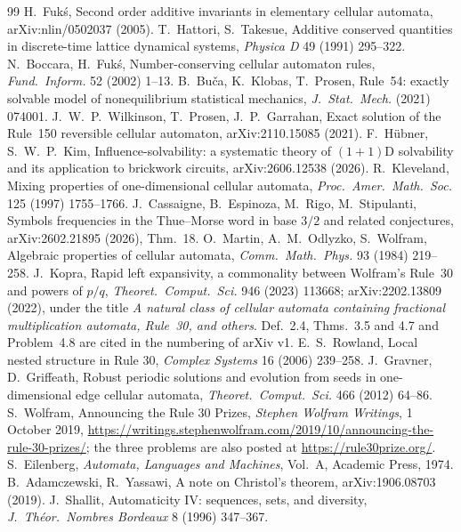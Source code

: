 \documentclass[11pt]{article}
\theoremstyle{definition}
\theoremstyle{remark}
\begin{document}
\begin{thebibliography}{99}
 H.~Fuk\'s, Second order additive invariants in elementary cellular automata, arXiv:nlin/0502037 (2005).
 T.~Hattori, S.~Takesue, Additive conserved quantities in discrete-time lattice dynamical systems, \emph{Physica D} 49 (1991) 295--322.
 N.~Boccara, H.~Fuk\'s, Number-conserving cellular automaton rules, \emph{Fund.\ Inform.} 52 (2002) 1--13.
 B.~Bu\v{c}a, K.~Klobas, T.~Prosen, Rule~54: exactly solvable model of nonequilibrium statistical mechanics, \emph{J.~Stat.\ Mech.} (2021) 074001.
 J.~W.~P.~Wilkinson, T.~Prosen, J.~P.~Garrahan, Exact solution of the Rule~150 reversible cellular automaton, arXiv:2110.15085 (2021).
 F.~H\"ubner, S.~W.~P.~Kim, Influence-solvability: a systematic theory of $(1+1)$D solvability and its application to brickwork circuits, arXiv:2606.12538 (2026).
 R.~Kleveland, Mixing properties of one-dimensional cellular automata, \emph{Proc.\ Amer.\ Math.\ Soc.} 125 (1997) 1755--1766.
 J.~Cassaigne, B.~Espinoza, M.~Rigo, M.~Stipulanti, Symbols frequencies in the Thue--Morse word in base $3/2$ and related conjectures, arXiv:2602.21895 (2026), Thm.~18.
 O.~Martin, A.~M.~Odlyzko, S.~Wolfram, Algebraic properties of cellular automata, \emph{Comm.\ Math.\ Phys.} 93 (1984) 219--258.
 J.~Kopra, Rapid left expansivity, a commonality between Wolfram's Rule~30 and powers of $p/q$, \emph{Theoret.\ Comput.\ Sci.} 946 (2023) 113668; arXiv:2202.13809 (2022), under the title \emph{A natural class of cellular automata containing fractional multiplication automata, Rule~30, and others}. Def.~2.4, Thms.~3.5 and 4.7 and Problem~4.8 are cited in the numbering of arXiv v1.
 E.~S.~Rowland, Local nested structure in Rule 30, \emph{Complex Systems} 16 (2006) 239--258.
 J.~Gravner, D.~Griffeath, Robust periodic solutions and evolution from seeds in one-dimensional edge cellular automata, \emph{Theoret.\ Comput.\ Sci.} 466 (2012) 64--86.
 S.~Wolfram, Announcing the Rule 30 Prizes, \emph{Stephen Wolfram Writings}, 1 October 2019, \url{https://writings.stephenwolfram.com/2019/10/announcing-the-rule-30-prizes/}; the three problems are also posted at \url{https://rule30prize.org/}.
 S.~Eilenberg, \emph{Automata, Languages and Machines}, Vol.~A, Academic Press, 1974.
 B.~Adamczewski, R.~Yassawi, A note on Christol's theorem, arXiv:1906.08703 (2019).
 J.~Shallit, Automaticity IV: sequences, sets, and diversity, \emph{J.~Th\'eor.\ Nombres Bordeaux} 8 (1996) 347--367.

\end{thebibliography}
\end{document}
